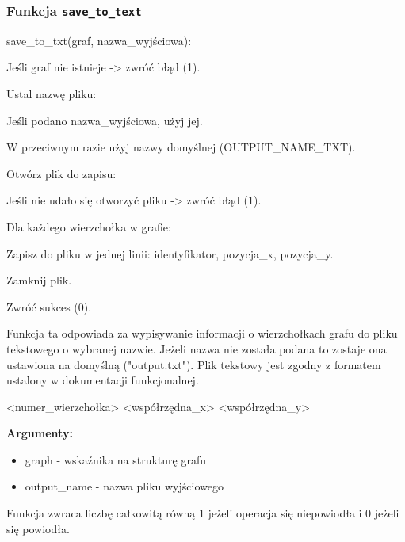 \documentclass[]{article}
\begin{document}
\subsubsection{Funkcja \texttt{save\_to\_text}}
\begin{mylisting}
 save_to_txt(graf, nazwa_wyjściowa):

    Jeśli graf nie istnieje -> zwróć błąd (1).

    Ustal nazwę pliku:

        Jeśli podano nazwa_wyjściowa, użyj jej.

        W przeciwnym razie użyj nazwy domyślnej (OUTPUT_NAME_TXT).

    Otwórz plik do zapisu:

        Jeśli nie udało się otworzyć pliku -> zwróć błąd (1).

    Dla każdego wierzchołka w grafie:

        Zapisz do pliku w jednej linii: identyfikator, pozycja_x, pozycja_y.

    Zamknij plik.

    Zwróć sukces (0).

    
\end{mylisting}

Funkcja ta odpowiada za wypisywanie informacji o wierzchołkach grafu do pliku tekstowego o wybranej nazwie. Jeżeli nazwa
nie została podana to zostaje ona ustawiona na domyślną ("output.txt"). Plik tekstowy jest zgodny z formatem ustalony
w dokumentacji funkcjonalnej.
\begin{mylisting}
<numer_wierzchołka> <współrzędna_x> <współrzędna_y>
\end{mylisting}

\textbf{Argumenty:}
\begin{itemize}
    \item graph - wskaźnika na strukturę grafu 
    \item output\_name - nazwa pliku wyjściowego
\end{itemize}
Funkcja zwraca liczbę całkowitą równą 1 jeżeli operacja się niepowiodła i 0 jeżeli się powiodła.
\end{document}
